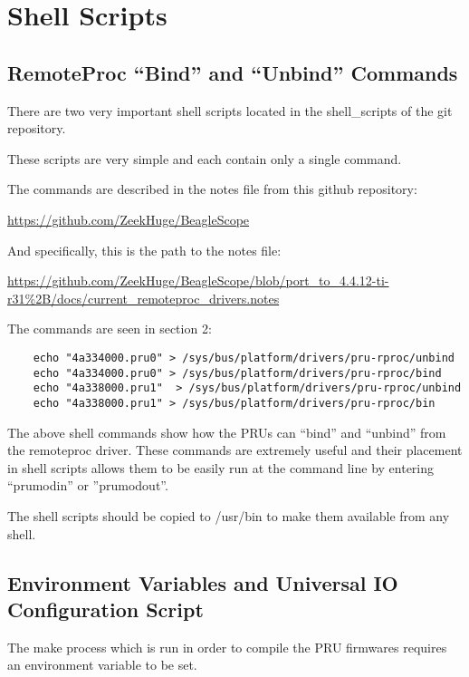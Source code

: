 %
%
%

\chapter{Shell Scripts}

\section{RemoteProc ``Bind'' and ``Unbind'' Commands}

There are two very important shell scripts located in the shell\_scripts of the git repository.

These scripts are very simple and each contain only a single command.

The commands are described in the notes file from this github repository:

\url{https://github.com/ZeekHuge/BeagleScope}

And specifically, this is the path to the notes file:

\url{https://github.com/ZeekHuge/BeagleScope/blob/port_to_4.4.12-ti-r31%2B/docs/current_remoteproc_drivers.notes} 
	
	The commands are seen in section 2:
	
	\begin{verbatim}
	echo "4a334000.pru0" > /sys/bus/platform/drivers/pru-rproc/unbind
	echo "4a334000.pru0" > /sys/bus/platform/drivers/pru-rproc/bind
	echo "4a338000.pru1"  > /sys/bus/platform/drivers/pru-rproc/unbind
	echo "4a338000.pru1" > /sys/bus/platform/drivers/pru-rproc/bin
	\end{verbatim}
	
	The above shell commands show how the PRUs can ``bind'' and ``unbind'' from the remoteproc driver.  These commands are extremely useful and their placement in shell scripts allows them to be easily run at the command line by entering ``prumodin'' or ''prumodout''.
	
	The shell scripts should be copied to /usr/bin to make them available from any shell.
	
\section{Environment Variables and Universal IO Configuration Script}

The make process which is run in order to compile the PRU firmwares requires an environment variable to be set.
